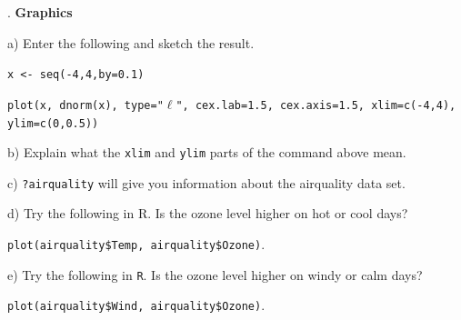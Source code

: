 \documentclass[10pt]{article}
\newcounter{EX}\setcounter{EX}{1}
\newcommand{\EXERCISE}{\arabic{EX}.\stepcounter{EX} }
\begin{document}
\EXERCISE \textbf{Graphics}

\SUBX a) Enter the following and sketch the result.

\hspace{20pt} \texttt{x <- seq(-4,4,by=0.1)}

\hspace{20pt} 
\texttt{plot(x, dnorm(x), type="$\ell$", cex.lab=1.5, cex.axis=1.5, xlim=c(-4,4), ylim=c(0,0.5))}
\vspace{0.5in}

\SUBX b) Explain what the \texttt{xlim} and \texttt{ylim} parts of the 
  command above mean.
\BSK\BSK

\SUBX c)  \texttt{?airquality} will give you information about the airquality data set.
\BSK

\SUBX d) Try the following in R. Is the ozone level higher on hot or 
   cool days?

\hspace{20pt} \texttt{plot(airquality\$Temp, airquality\$Ozone)}.  
\BSK\BSK

\SUBX e) Try the following in \texttt{R}. Is the ozone level higher on windy
   or calm days?

\hspace{20pt} \texttt{plot(airquality\$Wind, airquality\$Ozone)}.  
\BSK\BSK

%
\bigskip

\vfill
\eject
\end{document}
